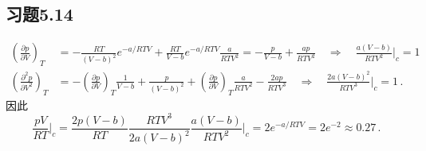 \documentclass[letterpaper, 10pt]{article}
\begin{document}
\subsection{习题5.14}
\begin{align*}
\left( \frac{\partial{p}}{\partial{V}} \right)_{T} & = -\frac{RT}{(V-b)^{2}} e^{-a/RTV} + \frac{RT}{V-b} e^{-a/RTV} \frac{a}{RTV^{2}} = -\frac{p}{V-b} + \frac{ap}{RTV^{2}} \quad{} \Rightarrow \quad{} \frac{a(V-b)}{RTV^{2}}\bigg\rvert_{c} = 1 \nonumber \\
\left( \frac{\partial^{2}{p}}{\partial{V}^{2}} \right)_{T} & = -\left( \frac{\partial{p}}{\partial{V}} \right)_{T} \frac{1}{V-b} + \frac{p}{(V-b)^{2}} + \left( \frac{\partial{p}}{\partial{V}} \right)_{T} \frac{a}{RTV^{2}} - \frac{2ap}{RTV^{3}} \quad{} \Rightarrow \quad{} \frac{2a(V-b)^{2}}{RTV^{3}}\bigg\rvert_{c} = 1\,.
\end{align*}
因此
\[ \frac{pV}{RT}\bigg\rvert_{c} = \frac{2p(V-b)}{RT} \frac{RTV^{3}}{2a(V-b)^2} \frac{a(V-b)}{RTV^{2}} \bigg\rvert_{c} = 2 e^{-a/RTV} = 2 e^{-2} \approx 0.27\,. \]
\end{document}
